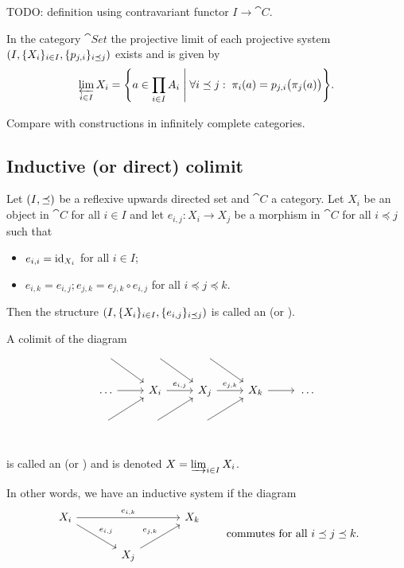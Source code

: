 TODO: definition using contravariant functor $I\to \cat{C}$.

\begin{proposition}
In the category $\cat{Set}$ the projective limit of each projective system $\left( I, \{X_i\}_{i\in I}, \{p_{j,i}\}_{i\preceq j} \right)$ exists and is given by
\[ \varprojlim _{i\in I}{X_{i}}=\setbuilder{a\in \prod _{i\in I}A_{i}}{\forall i\preceq j:\; \pi_i(a) = p_{j,i}\big(\pi_j(a)\big)}. \]
\end{proposition}
Compare with constructions in infinitely complete categories.

\subsection{Inductive (or direct) colimit}
\begin{definition}
Let $\left( I, \preceq \right)$ be a reflexive upwards directed set and $\cat{C}$ a category. Let $X_i$ be an object in $\cat{C}$ for all $i\in I$ and let $e_{i,j}: X_i \to X_j$ be a morphism in $\cat{C}$ for all $i \preceq j$ such that
\begin{itemize}
\item $e_{i,i} = \operatorname{id}_{X_i}$ for all $i\in I$;
\item $e_{i,k} = e_{i,j}; e_{j,k} = e_{j,k}\circ e_{i,j}$ for all $i\preceq j \preceq k$.
\end{itemize}
Then the structure $\left( I, \{X_i\}_{i\in I}, \{e_{i,j}\}_{i\preceq j} \right)$ is called an  (or ).

A colimit of the diagram
\[ \begin{tikzcd}
{} \ar[dr]&{}\ar[dr]&{}\ar[dr]&{}&{}\\
\hdots \ar[r] & X_i \ar[r, "e_{i,j}"] & X_j \ar[r, "e_{j,k}"] & X_k \ar[r] & {}\hdots \\
{}\ar[ur]&{}\ar[ur]&{}\ar[ur]&{}&{}\\
\end{tikzcd} \]
is called an  (or ) and is denoted $X=\varinjlim_{i\in I}{X_i}$.
\end{definition}
In other words, we have an inductive system if the diagram
\[ \begin{tikzcd}[column sep=large]
X_i \ar[rr, "e_{i,k}"] \ar[rd, "e_{i,j}"] & & X_k \\
& X_j \ar[ur, "e_{j,k}"]
\end{tikzcd} \qquad \text{commutes for all $i\preceq j \preceq k$.} \]

